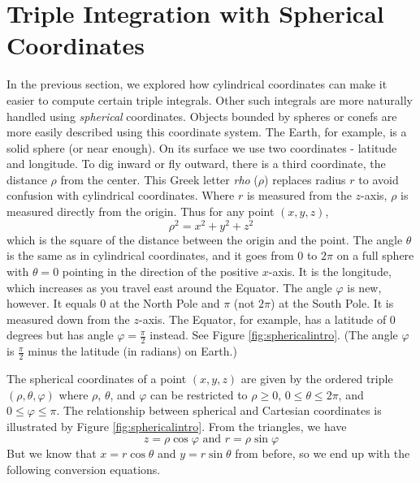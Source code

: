 \section{Triple Integration with Spherical Coordinates}\label{sec:spherical}

In the previous section, we explored how cylindrical coordinates can make it easier to compute certain triple integrals.  Other such integrals are more naturally handled using \emph{spherical} coordinates.
Objects bounded by spheres or conefs are more easily described using this coordinate system.  The Earth, for example, is a solid sphere (or near enough). On its surface we use two coordinates - latitude and longitude. To dig inward or fly outward, there is a third coordinate, the distance $\rho$ from the center. This Greek letter \textit{rho} ($\rho$) replaces radius $r$ to avoid confusion with cylindrical coordinates. Where $r$ is measured from the $z$-axis, $\rho$ is measured directly from the origin. Thus for any point $(x,y,z)$,
$$\rho^2 = x^2 + y^2 + z^2$$
which is the square of the distance between the origin and the point. The angle $\theta$ is the same as in cylindrical coordinates, and it goes from $0$ to $2\pi$ on a full sphere with $\theta = 0$ pointing in the direction of the positive $x$-axis. It is the longitude, which increases as you travel east around the Equator. The angle $\varphi$ is new, however. It equals $0$ at the North Pole and $\pi$ (not $2\pi$) at the South Pole. It is measured down from the $z$-axis. The Equator, for example, has a latitude of $0$ degrees but has angle $\varphi = \frac{\pi}{2}$ instead. See Figure \ref{fig:sphericalintro}.  (The angle $\varphi$ is $\frac{\pi}{2}$ minus the latitude (in radians) on Earth.)


The spherical coordinates of a point $(x,y,z)$ are given by the ordered triple $(\rho, \theta, \varphi)$ where $\rho$, $\theta$, and $\varphi$ can be restricted to $\rho \geq 0$, $0 \leq \theta \leq 2\pi$, and $0 \leq \varphi \leq \pi$.  The relationship between spherical and Cartesian coordinates is illustrated by Figure \ref{fig:sphericalintro}.  From the triangles, we have
$$z = \rho \cos\varphi \text{ and } r = \rho \sin\varphi$$
But we know that $x = r \cos\theta$ and $y = r \sin\theta$ from before, so we end up with the following conversion equations.\\

